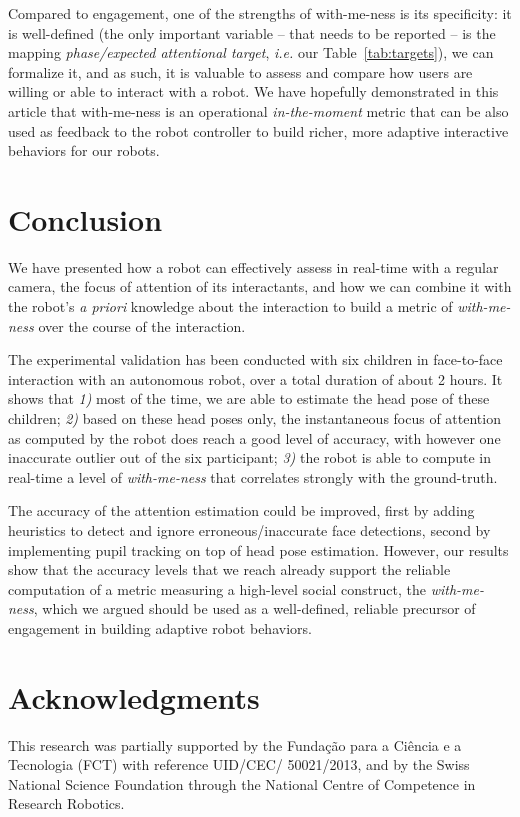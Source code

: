 \documentclass{sig-alternate}
\newcommand{\ie}{\textit{i.e.}\xspace}
\begin{document}
Compared to engagement, one of the strengths of with-me-ness is its specificity:
it is well-defined (the only important variable -- that needs to be reported --
is the mapping {\it phase/expected attentional target}, \ie our
Table~\ref{tab:targets}), we can formalize it, and as such, it is valuable to
assess and compare how users are willing or able to interact with a robot.  We
have hopefully demonstrated in this article that with-me-ness is an operational
\emph{in-the-moment} metric that can be also used as feedback to the robot
controller to build richer, more adaptive interactive behaviors for our robots.

\section{Conclusion}

We have presented how a robot can effectively assess in real-time with a regular
camera, the focus of attention of its interactants, and how we can combine it
with the robot's {\it a priori} knowledge about the interaction to build a
metric of \emph{with-me-ness} over the course of the interaction.

The experimental validation has been conducted with six children in face-to-face
interaction with an autonomous robot, over a total duration of about 2 hours. It
shows that {\it 1)} most of the time, we are able to estimate the head pose of
these children; {\it 2)} based on these head poses only, the instantaneous focus
of attention as computed by the robot does reach a good level of accuracy, with
however one inaccurate outlier out of the six participant; {\it 3)} the robot is
able to compute in real-time a level of \emph{with-me-ness} that correlates
strongly with the ground-truth.

The accuracy of the attention estimation could be improved, first by adding
heuristics to detect and ignore erroneous/inaccurate face detections, second by
implementing pupil tracking on top of head pose estimation. However, our results
show that the accuracy levels that we reach already support the reliable
computation of a metric measuring a high-level social construct, the
\emph{with-me-ness}, which we argued should be used as a well-defined, reliable
precursor of engagement in building adaptive robot behaviors.

\section*{Acknowledgments}

This research was partially supported by the Funda\c{c}\~{a}o para a Ci\^{e}ncia
e a Tecnologia (FCT) with reference UID/CEC/ 50021/2013, and by the Swiss
National Science Foundation through the National Centre of Competence in
Research Robotics.



\end{document}

